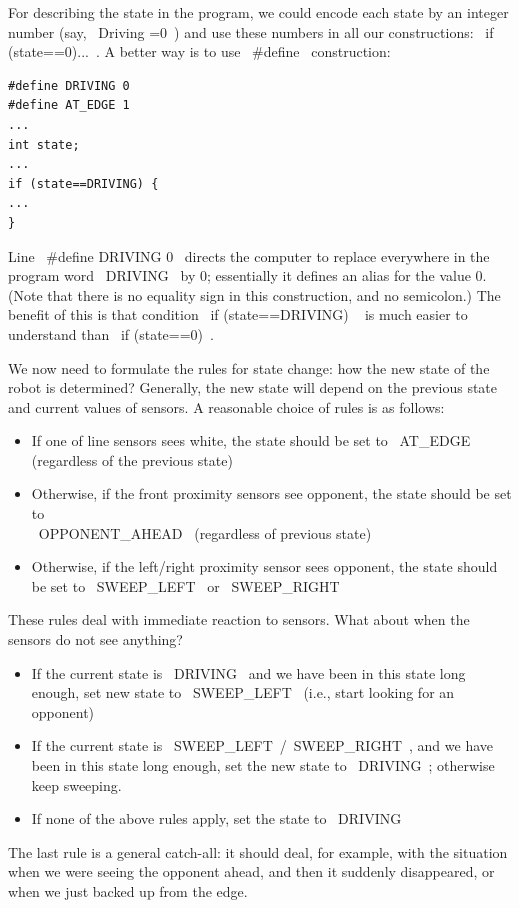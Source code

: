 \documentclass[oneside]{stml-l}
\numberwithin{figure}{chapter}
\begin{document}
For describing the state in the program, we could encode each state by an integer 
number (say, ~Driving =0~) and use these numbers in all our constructions: 
~if (state==0)...~. A better way is to use ~#define~ construction:
\begin{lstlisting}
#define DRIVING 0
#define AT_EDGE 1
...
int state;
...
if (state==DRIVING) {
...
}
\end{lstlisting}
Line ~#define DRIVING 0~ directs the computer to replace everywhere in the program 
word ~DRIVING~ by 0; essentially it defines an alias for the value 0. (Note that there is 
no equality sign in this construction, and no semicolon.) The benefit of this is that 
condition ~if (state==DRIVING) ~ is much easier to understand than ~if (state==0)~.

We now need to formulate the rules for state change: how the new state of the robot 
is determined? Generally, the new state will depend on the previous state and current values
of sensors. A reasonable choice of rules is as follows:

\begin{itemize}
\item If one of line sensors sees white, the state should be set to ~AT_EDGE~ 
    (regardless of the previous state)
\item Otherwise, if the front proximity sensors see opponent, the state should be 
set to\\ ~OPPONENT_AHEAD~ (regardless of previous state)
\item Otherwise, if the left/right proximity sensor sees opponent, the state should 
be set to ~SWEEP_LEFT~ or ~SWEEP_RIGHT~
\end{itemize}

These rules deal with immediate reaction to sensors. What about when the sensors 
do not see anything? 

\begin{itemize}
\item If the current state is ~DRIVING~ and we have been in this state long enough, 
set new state to ~SWEEP_LEFT~ (i.e., start looking for an opponent)
\item If the current state is ~SWEEP_LEFT~/~SWEEP_RIGHT~, and we have been in 
this state long enough, set the new state to ~DRIVING~; otherwise keep sweeping.
\item If none of the above rules apply, set the state to ~DRIVING~
\end{itemize}

The last rule is a general catch-all: it should deal, for example, with the situation 
when we were seeing the opponent ahead, and then it suddenly disappeared, or 
when we just backed up from the edge. 
\end{document}

